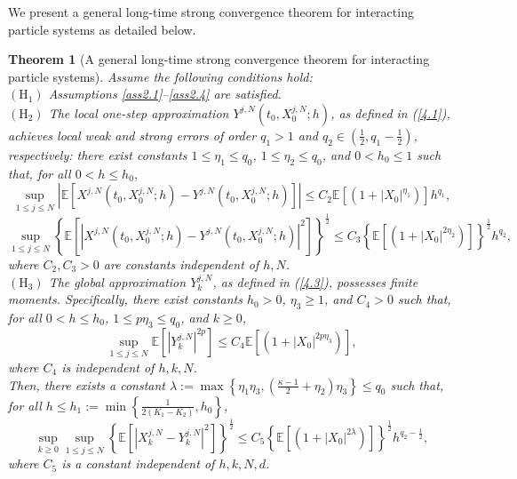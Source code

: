 \documentclass[12pt]{article}
\numberwithin{equation}{section}
\newtheorem{theorem}[assumption]{Theorem}   %
\begin{document}
We present a general  long-time strong convergence theorem for interacting
particle systems as detailed below.
\begin{theorem}[A general long-time strong convergence theorem for interacting particle systems]\label{theorem 4.2}
Assume the following conditions hold:\\
$\left(\mathrm{H}_1\right)$ Assumptions \ref{ass2.1}--\ref{ass2.4} are satisfied.\\
$\left(\mathrm{H}_2\right)$ The local 
 one-step approximation $Y^{j,N}\left(t_0, X^{j,N}_0 ; h\right)$, as defined in (\ref{4.1}), achieves local weak and strong errors of order $q_1>1$ and $q_2\in \left(\tfrac{1}{2}, q_1-\tfrac{1}{2}\right)$, respectively:  there exist constants $1 \leq \eta_1 \leq q_0$, $1 \leq \eta_2 \leq q_0$, and $0<h_0\leq 1$
such that, for all $0<h \leq h_0$, 
\begin{equation}\tag{3.10}\label{4.19}
\underset{1\leqslant j\leqslant N}{\sup}\left|\mathbb{E}\left[X^{j,N}\left(t_0, X^{j,N}_0 ; h\right)-Y^{j,N}\left(t_0, X^{j,N}_0 ; h\right)\right]\right| \leq C_2\mathbb{E}\left[\left(1+\left|X_0\right|^{\eta_1}\right)\right] h^{q_1}, 
\end{equation}
\begin{equation}\tag{3.11}\label{4.20}
\underset{1\leqslant j\leqslant N}{\sup}\left\{\mathbb{E}\left[\left|X^{j,N}\left(t_0, X^{j,N}_0 ; h\right)-Y^{j,N}\left(t_0, X^{j,N}_0 ; h\right)\right|^{2}\right]\right\}^{\frac{1}{2}}\leq C_3\left\{\mathbb{E}\left[\left(1+\left|X_0\right|^{2\eta_2}\right) \right]\right\}^{\frac{1}{2}}h^{q_2},
\end{equation}
where $C_2, C_3>0$ are constants independent of 
 $h, N$.\\
$\left(\mathrm{H}_3\right)$ The global approximation $Y^{j,N}_k$, as defined in (\ref{4.3}), possesses finite moments. Specifically, there exist constants $h_0>0$, $\eta_3 \geq 1$, and $C_4>0$ such that, for all $0<h \leq h_0$, $1 \leq p\eta_3 \leq q_0$, and $k \geq 0$,
\begin{equation}\tag{3.12}\label{4.21}
\underset{1\leqslant j\leqslant N}{\sup}\mathbb{E}\left[\left|Y^{j,N}_k\right|^{2 p}\right] \leq C_4\mathbb{E}\left[\left(1+\left|X_0\right|^{2 p\eta_3}\right)\right],
\end{equation}
where $C_4$ is independent of  $h, k,N$.\\
Then, there exists a constant $\lambda:=\max \left\{\eta_1\eta_3 ,\left(\tfrac{\kappa-1}{2}+\eta_2\right)\eta_3 \right\} \leq q_0$  such that, for all  $h \leq h_1:=\min \left\{\tfrac{1}{2\left(K_1-K_2\right)}, h_0\right\}$, 
\begin{equation}\tag{3.13}\label{4.22}
\underset{k\geqslant0}{\sup}\underset{1\leqslant j\leqslant N}{\sup}\left\{\mathbb{E}\left[\left|X^{j,N}_k-Y^{j,N}_k\right|^{2}\right]\right\}^{\frac{1}{2}}\le C_5\left\{\mathbb{E}\left[\left(1+\left|X_0\right|^{2 \lambda}\right)\right]\right\}^{\frac{1}{2}} h^{q_2-\frac{1}{2}},
\end{equation}
where $C_{5}$ is a constant independent of $h, k,N,d$.
\end{theorem}
\end{document}
